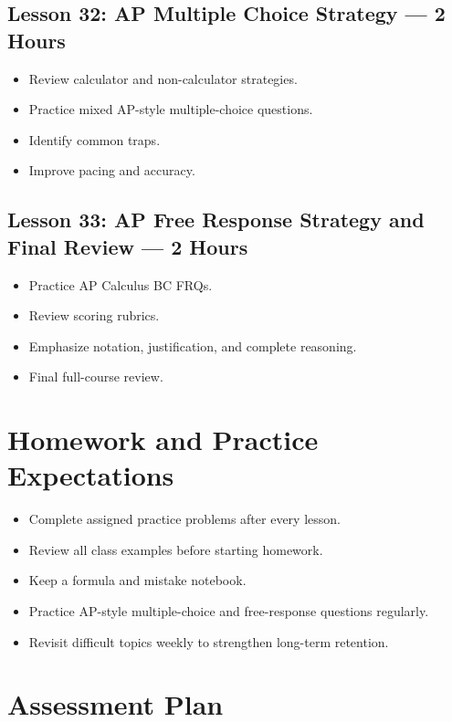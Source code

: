 \documentclass[11pt]{article}
\newcommand{\circnum}[1]{%
\tikz[baseline=(char.base)]{
\node[shape=circle, draw=NovelPurple, text=NovelPurple, line width=0.8pt, inner sep=1.6pt] (char) {\small #1};
}}
\begin{document}
\subsection*{\circnum{32} Lesson 32: AP Multiple Choice Strategy --- 2 Hours}
\begin{itemize}
    \item Review calculator and non-calculator strategies.
    \item Practice mixed AP-style multiple-choice questions.
    \item Identify common traps.
    \item Improve pacing and accuracy.
\end{itemize}

\subsection*{\circnum{33} Lesson 33: AP Free Response Strategy and Final Review --- 2 Hours}
\begin{itemize}
    \item Practice AP Calculus BC FRQs.
    \item Review scoring rubrics.
    \item Emphasize notation, justification, and complete reasoning.
    \item Final full-course review.
\end{itemize}

\section*{Homework and Practice Expectations}

\begin{itemize}
    \item Complete assigned practice problems after every lesson.
    \item Review all class examples before starting homework.
    \item Keep a formula and mistake notebook.
    \item Practice AP-style multiple-choice and free-response questions regularly.
    \item Revisit difficult topics weekly to strengthen long-term retention.
\end{itemize}

\section*{Assessment Plan}
\end{document}
